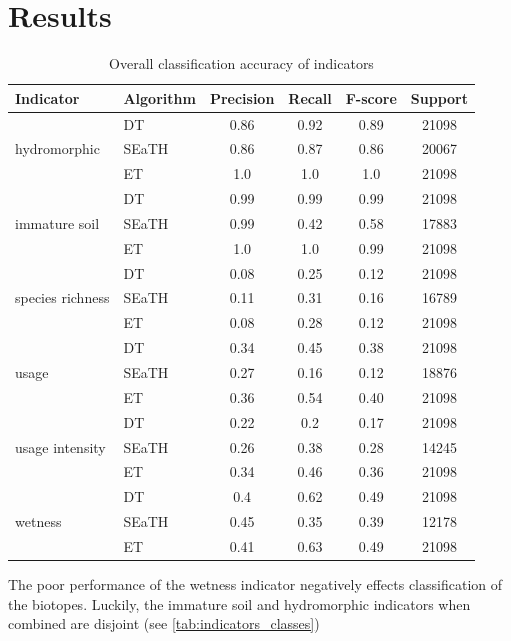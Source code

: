 \documentclass[authoryear,review,12pt,number]{elsarticle}
\begin{document}
\section{Results}
\begin{table}
    \centering
    \begin{tabular}{l l c c c c}
    Indicator & Algorithm & Precision & Recall & F-score & 
    Support\\
    \hline
    \multirow{3}{*}{hydromorphic}
    & DT & 0.86 & 0.92 & 0.89 & 21098\\
    & SEaTH & 0.86 & 0.87 & 0.86 & 20067\\
    & ET & 1.0 & 1.0 & 1.0 & 21098\\
    \cline{2-6}
    \multirow{3}{*}{immature soil}
    & DT & 0.99 & 0.99 & 0.99 & 21098\\
    & SEaTH & 0.99 & 0.42 & 0.58 & 17883\\
    & ET & 1.0 & 1.0 & 0.99 & 21098\\
    \cline{2-6}
    \multirow{3}{*}{species richness}
    & DT & 0.08 & 0.25 & 0.12 & 21098\\
    & SEaTH & 0.11 & 0.31 & 0.16 & 16789\\
    & ET & 0.08 & 0.28 & 0.12 & 21098\\
    \cline{2-6}
    \multirow{3}{*}{usage}
    & DT & 0.34 & 0.45 & 0.38 & 21098\\
    & SEaTH & 0.27 & 0.16 & 0.12 & 18876\\
    & ET & 0.36 & 0.54 & 0.40 & 21098\\
    \cline{2-6}
    \multirow{3}{*}{usage intensity}
    & DT & 0.22 & 0.2 & 0.17 & 21098\\
    & SEaTH & 0.26 & 0.38 & 0.28 & 14245\\
    & ET & 0.34 & 0.46 & 0.36 & 21098\\
    \cline{2-6}
    \multirow{3}{*}{wetness}
    & DT & 0.4 & 0.62 & 0.49 & 21098\\
    & SEaTH & 0.45 & 0.35 & 0.39 & 12178\\
    & ET & 0.41 & 0.63 & 0.49 & 21098\\
    \end{tabular}
    \caption{Overall classification accuracy of 
indicators\label{tab:accuracy_indicators}}
\end{table}
The poor performance of the wetness indicator negatively effects classification 
of the
biotopes. Luckily, the immature soil and hydromorphic indicators when combined
are disjoint (see \ref{tab:indicators_classes})
\end{document}
